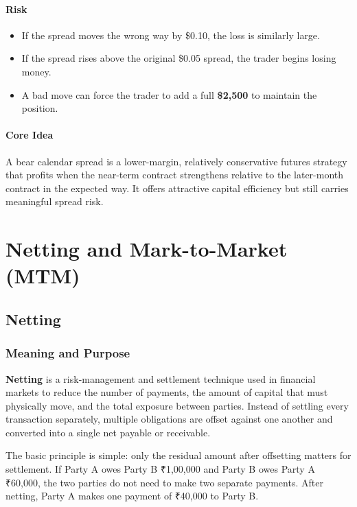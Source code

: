 \documentclass[12pt,openany]{book}
\begin{document}
\paragraph{Risk}

\begin{itemize}[leftmargin=*]
    \item If the spread moves the wrong way by \$0.10, the loss is similarly large.
    \item If the spread rises above the original \$0.05 spread, the trader begins losing money.
    \item A bad move can force the trader to add a full \textbf{\$2,500} to maintain the position.
\end{itemize}

\paragraph{Core Idea}

A bear calendar spread is a lower-margin, relatively conservative futures strategy that profits when the near-term contract strengthens relative to the later-month contract in the expected way. It offers attractive capital efficiency but still carries meaningful spread risk.


\section{Netting and Mark-to-Market (MTM)}

\subsection{Netting}

\subsubsection{Meaning and Purpose}
\textbf{Netting} is a risk-management and settlement technique used in financial markets to reduce the number of payments, the amount of capital that must physically move, and the total exposure between parties. Instead of settling every transaction separately, multiple obligations are offset against one another and converted into a single net payable or receivable.

The basic principle is simple: only the residual amount after offsetting matters for settlement. If Party A owes Party B ₹1,00,000 and Party B owes Party A ₹60,000, the two parties do not need to make two separate payments. After netting, Party A makes one payment of ₹40,000 to Party B.
\end{document}
